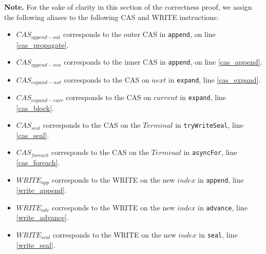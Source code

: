 \documentclass[runningheads,a4paper]{llncs}
\begin{document}


\noindent \textbf{Note.} For the sake of clarity in this section of the
correctness proof, we assign the following aliases to the following CAS and
WRITE instructions:

\begin{itemize}
\setlength{\itemindent}{-1em}
\item $CAS_{append-out}$ corresponds to the outer CAS in \verb=append=, on line \ref{cas_propagate}.
\item $CAS_{append-inn}$ corresponds to the inner CAS in \verb=append=, on line \ref{cas_append}.
\item $CAS_{expand-nxt}$ corresponds to the CAS on $next$ in \verb=expand=, line \ref{cas_expand}.
\item $CAS_{expand-curr}$ corresponds to the CAS on $current$ in \verb=expand=, line \ref{cas_block}.
\item $CAS_{seal}$ corresponds to the CAS on the $Terminal$ in \verb=tryWriteSeal=, line \ref{cas_seal}.
\item $CAS_{foreach}$ corresponds to the CAS on the $Terminal$ in \verb=asyncFor=, line \ref{cas_foreach}.
\item $WRITE_{app}$ corresponds to the WRITE on the new $index$ in \verb=append=, line \ref{write_append}.
\item $WRITE_{adv}$ corresponds to the WRITE on the new $index$ in \verb=advance=, line \ref{write_advance}.
\item $WRITE_{seal}$ corresponds to the WRITE on the new $index$ in \verb=seal=, line \ref{write_seal}.
\end{itemize}
\end{document}
